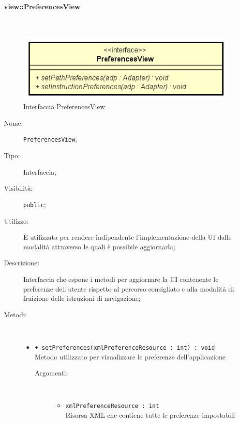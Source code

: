 \documentclass[../DefinizioneDiProdotto.tex]{subfiles}
\begin{document}
\paragraph{view::PreferencesView}
\
\begin{figure}[H]
	\centering
	\includegraphics[width=\maxwidth]{img/PreferencesView.png}
	\caption{Interfaccia PreferencesView}\label{fig:view::PreferencesView} 
\end{figure}
\begin{description}
	\item[Nome:] \texttt{PreferencesView};
	\item[Tipo:] Interfaccia;
	\item[Visibilità:] \texttt{public};
	\item[Utilizzo:] È utilizzata per rendere indipendente l'implementazione della UI dalle modalità attraverso le quali è possibile aggiornarla;
	\item[Descrizione:] Interfaccia che espone i metodi per aggiornare la UI contenente le preferenze dell'utente rispetto al percorso consigliato e alla modalità di fruizione delle istruzioni di navigazione;
	\item[Metodi:] \
	\begin{itemize}
		\item \texttt{+ setPreferences(xmlPreferenceResource : int) : void}\\
		Metodo utilizzato per visualizzare le preferenze dell'applicazione
		\begin{description}
			\item[Argomenti:] \
			\begin{itemize}
				\item \texttt{xmlPreferenceResource : int}\\
				Risorsa XML che contiene tutte le preferenze impostabili\end{itemize}
		\end{description}
	\end{itemize}
\end{description}
\end{document}

